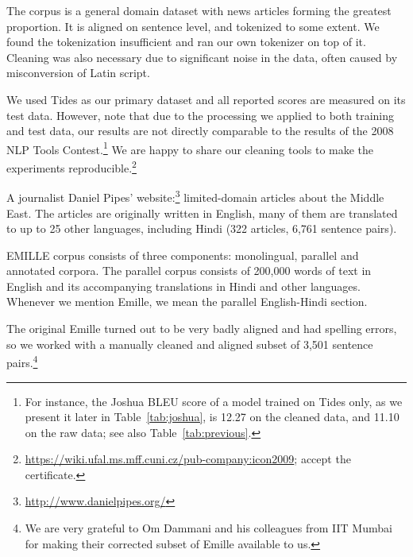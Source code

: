 \documentclass[11pt]{article}
\def\Tref#1{Table~\ref{#1}}
\begin{document}
The corpus is a general domain dataset with news articles forming the greatest
proportion. It is aligned on sentence level, and tokenized to some extent.
We found the tokenization insufficient
and ran our own tokenizer on top of it.
Cleaning was also necessary due to significant noise in the data, often caused
by misconversion of Latin script.
    
We used Tides as our primary dataset and all reported scores are measured on its
test data. However, note that due to the processing we applied to both training
and test data, our results are not directly comparable to the results of the
2008 NLP Tools Contest.\footnote{For instance, the Joshua BLEU score of a model
trained on Tides only, as we present it later in \Tref{tab:joshua}, is 12.27 on
the cleaned data, and 11.10 on the raw data; see also \Tref{tab:previous}.} We are happy
to share our cleaning tools to make the experiments reproducible.\footnote{\url{https://wiki.ufal.ms.mff.cuni.cz/pub-company:icon2009}; accept the certificate.}

\label{sec:dpipes}
A journalist Daniel Pipes' website:\footnote{\url{http://www.danielpipes.org/}} limited-domain articles about the Middle East. 
The articles are originally written in English, many of them are translated to
up to 25 other languages, including Hindi (322 articles, 6,761 sentence
pairs).

\label{sec:emille}
EMILLE corpus \citep{baker:2002} consists of three components: monolingual,
parallel and annotated corpora.
The parallel corpus consists of 200,000 words of text in English and
its accompanying translations in Hindi and other languages. Whenever we mention
Emille, we mean the parallel English-Hindi section.

The original Emille turned out to be very badly aligned and had spelling errors,
so we worked with a manually cleaned and aligned subset of 3,501 sentence
pairs.\footnote{We are very grateful to Om Dammani and his colleagues from IIT
Mumbai for making their corrected subset of Emille available to us.}
\end{document}
